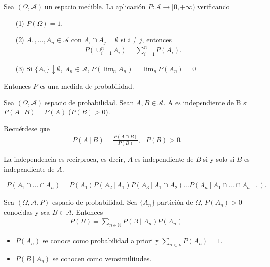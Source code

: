 \begin{teo}
    Sea $(\Omega, \mathcal{A})$ un espacio medible. La aplicación $P: \mathcal{A} \longrightarrow [0,+\infty)$ verificando
    \begin{enumerate}
        \item[(1)] $P(\Omega) = 1$.
        \item[(2)] $A_1,...,A_n \in \mathcal{A}$ con $A_i \cap A_j = \emptyset$ si $i \not = j$, entonces
              \begin{align*}
                  P(\cup_{i=1}^{n}{A_i}) = \sum_{i=1}^{n}{P(A_i)}.
              \end{align*}
        \item[(3)] Si $\{A_n\} \downarrow \emptyset$, $A_n \in \mathcal{A}$, $P(\lim_{n}{A_n}) = \lim_{n}{P(A_n)} = 0$
    \end{enumerate}
    Entonces $P$ es una medida de probabilidad.
\end{teo}

\begin{defi}
    Sea $(\Omega, \mathcal{A})$ espacio de probabilidad. Sean $A, B \in \mathcal{A}$. A es independiente de B si $P(A \ | \ B) = P(A)$ ($P(B) > 0$).

    Recuérdese que
    \begin{align*}
        P(A \ | \ B) = \frac{P(A \cap B)}{P(B)}, \ \ \ P(B) > 0.
    \end{align*}
\end{defi}

\begin{obs}
    La independencia es recírproca, es decir, $A$ es independiente de $B$ si y solo si $B$ es independiente de $A$.
\end{obs}

\begin{teo}
    \begin{align*}
        P(A_1 \cap ... \cap A_n) = P(A_1)P(A_2 \ | \ A_1)P(A_3 \ | \ A_1 \cap A_2)...P(A_n \ | \ A_1 \cap ... \cap A_{n-1}).
    \end{align*}
\end{teo}

\begin{teo}
    Sea $(\Omega, \mathcal{A}, P)$ espacio de probabilidad. Sea $\{A_n\}$ partición de $\Omega$, $P(A_n) > 0$ conocidas y sea $B \in \mathcal{A}$. Entonces
    \begin{align*}
        P(B) = \sum_{n \in \mathbb{N}}{P(B \ | \ A_n)P(A_n)}.
    \end{align*}
    \begin{itemize}
        \item $P(A_n)$ se conoce como probabilidad a priori y $\sum_{n \in \mathbb{N}}{P(A_n)} = 1$.
        \item $P(B \ | \ A_n)$ se conocen como verosimilitudes.
    \end{itemize}
\end{teo}

